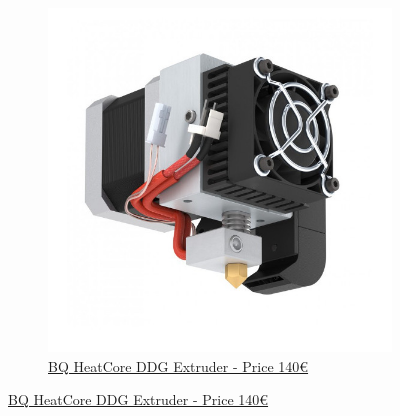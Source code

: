 \documentclass[11pt,a4paper]{article}
\begin{document}
\begin{figure}[H]
\begin{subfigure}[b]{0.4\textwidth}
        \includegraphics[width=\textwidth,cfbox=azul_marcos 4pt 0pt]{FOTOS/EXTRUSOR6}
		\caption*{\href{http://www.bq.es}{{\footnotesize BQ HeatCore DDG Extruder - Price 140\euro}}}
    \end{subfigure}
\end{figure}
\end{document}
